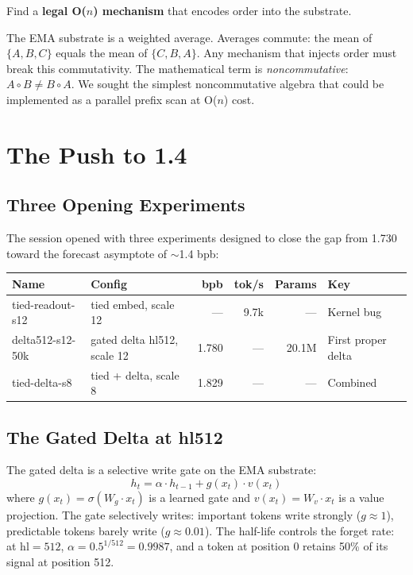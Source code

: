 \documentclass[11pt,a4paper]{report}
\begin{document}
Find a \textbf{legal O($n$) mechanism} that encodes order into the substrate.

The EMA substrate is a weighted average. Averages commute: the mean of $\{A, B, C\}$ equals the mean of $\{C, B, A\}$. Any mechanism that injects order must break this commutativity. The mathematical term is \textit{noncommutative}: $A \circ B \neq B \circ A$. We sought the simplest noncommutative algebra that could be implemented as a parallel prefix scan at O($n$) cost.


\chapter{The Push to 1.4}

\section{Three Opening Experiments}

The session opened with three experiments designed to close the gap from 1.730 toward the forecast asymptote of $\sim$1.4 bpb:

\begin{center}
\begin{tabular}{llrrrl}
\toprule
Name & Config & bpb & tok/s & Params & Key \\
\midrule
tied-readout-s12 & tied embed, scale 12 & --- & 9.7k & --- & Kernel bug \\
delta512-s12-50k & gated delta hl512, scale 12 & 1.780 & --- & 20.1M & First proper delta \\
tied-delta-s8 & tied + delta, scale 8 & 1.829 & --- & --- & Combined \\
\bottomrule
\end{tabular}
\end{center}

\section{The Gated Delta at hl512}

The gated delta is a selective write gate on the EMA substrate:
\[
h_t = \alpha \cdot h_{t-1} + g(x_t) \cdot v(x_t)
\]
where $g(x_t) = \sigma(W_g \cdot x_t)$ is a learned gate and $v(x_t) = W_v \cdot x_t$ is a value projection. The gate selectively writes: important tokens write strongly ($g \approx 1$), predictable tokens barely write ($g \approx 0.01$). The half-life controls the forget rate: at $\text{hl} = 512$, $\alpha = 0.5^{1/512} = 0.9987$, and a token at position 0 retains 50\% of its signal at position 512.
\end{document}
